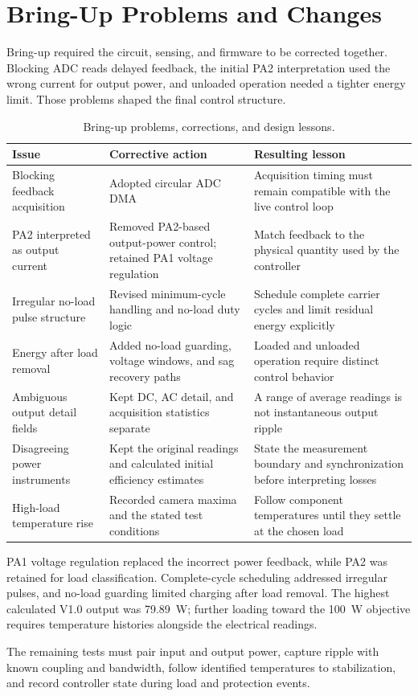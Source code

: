 \section{Bring-Up Problems and Changes}
\label{sec:res-failures}

Bring-up required the circuit, sensing, and firmware to be corrected together.
Blocking ADC reads delayed feedback, the initial PA2 interpretation used the
wrong current for output power, and unloaded operation needed a tighter
energy limit. Those problems shaped the final control structure.

\begin{table}[htbp]
\centering
\caption{Bring-up problems, corrections, and design lessons.}
\label{tab:failure-log}
\small
\begin{tabularx}{\textwidth}{@{}L{0.23\textwidth}L{0.36\textwidth}X@{}}
\toprule
Issue & Corrective action & Resulting lesson\\
\midrule
Blocking feedback acquisition & Adopted circular ADC DMA & Acquisition timing must remain compatible with the live control loop\\
PA2 interpreted as output current & Removed PA2-based output-power control; retained PA1 voltage regulation & Match feedback to the physical quantity used by the controller\\
Irregular no-load pulse structure & Revised minimum-cycle handling and no-load duty logic & Schedule complete carrier cycles and limit residual energy explicitly\\
Energy after load removal & Added no-load guarding, voltage windows, and sag recovery paths & Loaded and unloaded operation require distinct control behavior\\
Ambiguous output detail fields & Kept DC, AC detail, and acquisition statistics separate & A range of average readings is not instantaneous output ripple\\
Disagreeing power instruments & Kept the original readings and calculated initial efficiency estimates & State the measurement boundary and synchronization before interpreting losses\\
High-load temperature rise & Recorded camera maxima and the stated test conditions & Follow component temperatures until they settle at the chosen load\\
\bottomrule
\end{tabularx}
\end{table}
\FloatBarrier

PA1 voltage regulation replaced the incorrect power feedback, while PA2
was retained for load classification. Complete-cycle scheduling addressed
irregular pulses, and no-load guarding limited charging after load removal.
The highest calculated V1.0 output was \SI{79.89}{\watt}; further loading toward
the \SI{100}{\watt} objective requires temperature histories alongside the
electrical readings.

The remaining tests must pair input and output power, capture ripple with
known coupling and bandwidth, follow identified temperatures to stabilization,
and record controller state during load and protection events.
